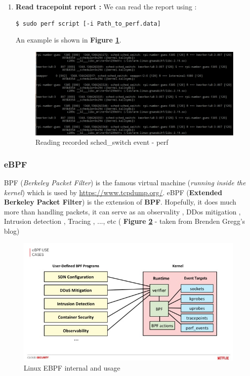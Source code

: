 \begin{itemize}
\begin{enumerate}
			\item \textbf{Read tracepoint report : } We can read the report using :
 	\begin{lstlisting}[style=BashInputStyle]   	
    	$ sudo perf script [-i Path_to_perf.data]
    \end{lstlisting} 			
An example is shown in \textbf{Figure \ref{Reading recorded sched-switch event - perf}}.
					\begin{figure}[H]
						\centering
        				\includegraphics[scale=0.25]{img/solution/read-perf-trace-sched-switch.png}
        				\caption{Reading recorded sched\_switch event - perf}
        				\label{Reading recorded sched-switch event - perf}
    				\end{figure}				
			
		\end{enumerate}
		
\end{itemize}


\subsubsection{eBPF}
BPF (\textit{Berkeley Packet Filter}) is the famous virtual machine (\textit{running inside the kernel}) which is used by {\color{blue}\url{https://www.tcpdump.org/}}.
eBPF (\textbf{Extended Berkeley Packet Filter}) is the extension of \textbf{BPF}. Hopefully, it does much more than handling packets, it can serve as an observality , DDos mitigation , Intrusion detection , Tracing , ..., etc ( \textbf{Figure \ref{Linux EBPF internal and usage}} - taken from Brenden Gregg's blog)
					\begin{figure}[H]
						\centering
        				\includegraphics[scale=0.4]{img/solution/security-monitoring-with-ebpf-11-638.jpg}
        				\caption{Linux EBPF internal and usage}
        				\label{Linux EBPF internal and usage}
    				\end{figure}	

